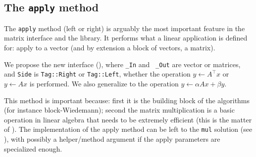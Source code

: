 \subsection{The \texttt{apply} method}\label{ssec:apply}
%
%
\par
%
The \texttt{apply} method (left or right) is arguably the most important
feature in the matrix interface and the \linbox library. It performs what a
linear application is defined for: apply to a vector (and by extension  a block
of vectors, \ie a matrix).
%
\par
%
We propose the new interface (), where {\tt \_In} and {\tt
\_Out} are vector or matrices, and {\tt Side} is {\tt Tag::Right} or
{\tt Tag::Left}, whether the operation $y \gets A^{\top} x$ or  $y \gets A x$ is
performed. We also generalize to the operation $y \gets \alpha A x + \beta y$.
%

%
This method is important because: first it is the building block of the \applin
algorithms (for instance block-Wiedemann); second the matrix multiplication is
a basic operation in linear algebra that needs to be extremely efficient (this
is the matter of ).
%
%
%
The implementation of the apply method can be left to the {\tt mul} solution
(see ), with possibly a helper/method argument if the apply
parameters are specialized enough.
%
%
%
